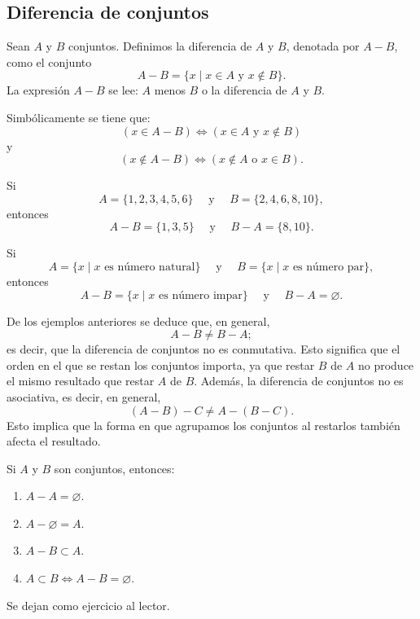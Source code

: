 \subsection{Diferencia de conjuntos}

\begin{definicion}{}{}
    Sean $A$ y $B$ conjuntos. Definimos la diferencia de $A$ y $B$, denotada por $A - B$, como el conjunto
    $$A - B = \{x \mid x \in A \text { y } x \notin B\}.$$
    La expresión $A - B$ se lee: $A$ menos $B$ o la diferencia de $A$ y $B$.
\end{definicion}

Simbólicamente se tiene que:
$$(x \in A - B) \Longleftrightarrow(x \in A \text{ y } x \notin B)$$
y
$$(x \notin A - B) \Longleftrightarrow(x \notin A \text{ o } x \in B).$$

\begin{examplebox}{}{}
    Si
    $$A = \{1,  2,  3,  4,  5,  6\} \quad \text{ y } \quad B = \{2,  4,  6,  8,  10\},$$
    entonces
    $$A - B = \{1,  3,  5\} \quad \text{ y } \quad B - A = \{8,  10\}.$$
\end{examplebox}

\begin{examplebox}{}{}
    Si
    $$A = \{x \mid x \text { es número natural}\} \quad \text{ y } \quad B = \{x \mid x \text { es número par}\},$$
    entonces 
    $$A - B = \{x \mid x \text { es número impar}\} \quad \text{ y } \quad B - A = \varnothing.$$
\end{examplebox}

De los ejemplos anteriores se deduce que, en general,
$$A - B \neq B - A;$$\newpage\noindent
es decir, que la diferencia de conjuntos no es conmutativa. Esto significa que el orden en el que se restan los conjuntos importa, ya que restar $B$ de $A$ no produce el mismo resultado que restar $A$ de $B$. Además, la diferencia de conjuntos no es asociativa, es decir, en general,
$$(A - B) - C \neq A - (B - C).$$
Esto implica que la forma en que agrupamos los conjuntos al restarlos también afecta el resultado.

\begin{prop}{}{}
    Si $A$ y $B$ son conjuntos, entonces:
    \begin{enumerate}[label=\roman*., topsep=6pt, itemsep=0pt]
        \item $A - A = \varnothing$.
        \item $A - \varnothing = A$.
        \item $A - B \subset A$.
        \item $A \subset B \Longleftrightarrow A - B = \varnothing$.
    \end{enumerate}
    \tcblower
    \demostracion Se dejan como ejercicio al lector.
\end{prop}

